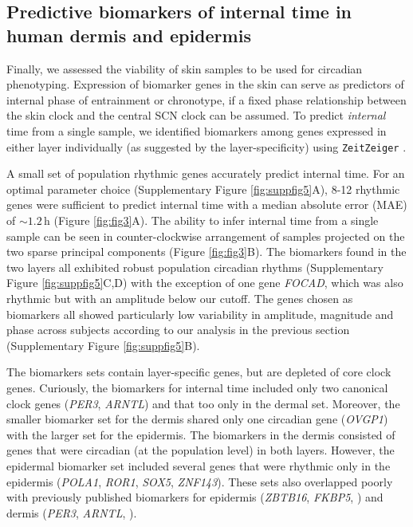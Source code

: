 
\subsection*{Predictive biomarkers of internal time in human dermis and epidermis}
Finally, we assessed the viability of skin samples to be used for circadian phenotyping. Expression of biomarker genes in the skin can serve as predictors of internal phase of entrainment or chronotype, if a fixed phase relationship between the skin clock and the central SCN clock can be assumed. To predict \textit{internal} time from a single sample, we identified biomarkers among genes expressed in either layer individually (as suggested by the layer-specificity) using \texttt{ZeitZeiger} \cite{Hughey2016}.

A small set of population rhythmic genes accurately predict internal time. For an optimal parameter choice (Supplementary Figure \ref{fig:suppfig5}A), 8-12 rhythmic genes were sufficient to predict internal time with a median absolute error (MAE) of $\sim 1.2$\,h (Figure \ref{fig:fig3}A). The ability to infer internal time from a single sample can be seen in counter-clockwise arrangement of samples projected on the two sparse principal components (Figure \ref{fig:fig3}B). The biomarkers found in the two layers all exhibited robust population circadian rhythms (Supplementary Figure \ref{fig:suppfig5}C,D) with the exception of one gene \textit{FOCAD}, which was also rhythmic but with an amplitude below our cutoff. The genes chosen as biomarkers all showed particularly low variability in amplitude, magnitude and phase across subjects according to our analysis in the previous section (Supplementary Figure \ref{fig:suppfig5}B).

The biomarkers sets contain layer-specific genes, but are depleted of core clock genes. Curiously, the biomarkers for internal time included only two canonical clock genes (\textit{PER3}, \textit{ARNTL}) and that too only in the dermal set. Moreover, the smaller biomarker set for the dermis shared only one circadian gene (\textit{OVGP1}) with the larger set for the epidermis. The biomarkers in the dermis consisted of genes that were circadian (at the population level) in both layers. However, the epidermal biomarker set included several genes that were rhythmic only in the epidermis (\textit{POLA1}, \textit{ROR1}, \textit{SOX5}, \textit{ZNF143}). These sets also overlapped poorly with previously published biomarkers for epidermis (\textit{ZBTB16}, \textit{FKBP5}, \cite{Wu2018}) and dermis (\textit{PER3}, \textit{ARNTL}, \cite{Wu2020}). %

